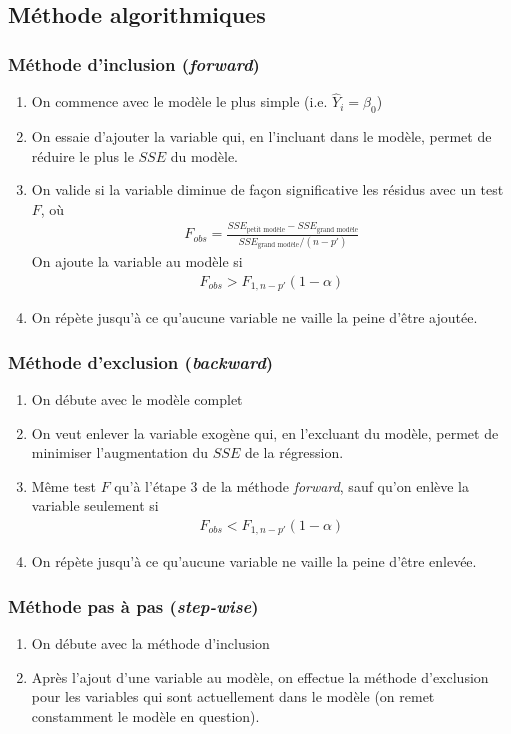 \documentclass[10pt, french]{article}
\begin{document}
\begin{multicols*}{3}
\subsection*{Méthode algorithmiques}

\subsubsection*{Méthode d'inclusion (\textit{forward})}
\begin{enumerate}
\item On commence avec le modèle le plus simple (i.e. $\hat{Y}_i = \beta_0$)
\item On essaie d'ajouter la variable qui, en l'incluant dans le modèle, permet de réduire le plus le $SSE$ du modèle.
\item On valide si la variable diminue de façon significative les résidus avec un test $F$, où
\begin{align*}
F_{obs} = \frac{SSE_{\text{petit modèle}} - SSE_{\text{grand modèle}}}{SSE_{\text{grand modèle}} / (n-p')}
\end{align*}
On ajoute la variable au modèle si
\begin{align*}
F_{obs} > F_{1, n-p'}(1 - \alpha)
\end{align*}
\item On répète jusqu'à ce qu'aucune variable ne vaille la peine d'être ajoutée.
\end{enumerate}


\subsubsection*{Méthode d'exclusion (\textit{backward})}
\begin{enumerate}
\item On débute avec le modèle complet
\item On veut enlever la variable exogène qui, en l'excluant du modèle, permet de minimiser l'augmentation du $SSE$ de la régression.
\item Même test $F$ qu'à l'étape 3 de la méthode \textit{forward}, sauf qu'on enlève la variable seulement si
\begin{align*}
F_{obs} < F_{1, n-p'}(1-\alpha)
\end{align*}
\item On répète jusqu'à ce qu'aucune variable ne vaille la peine d'être enlevée.
\end{enumerate}


\subsubsection*{Méthode pas à pas (\textit{step-wise})}
\begin{enumerate}
\item On débute avec la méthode d'inclusion
\item Après l'ajout d'une variable au modèle, on effectue la méthode d'exclusion pour les variables qui sont actuellement dans le modèle (on remet constamment le modèle en question).
\end{enumerate}


\end{multicols*}
\end{document}
